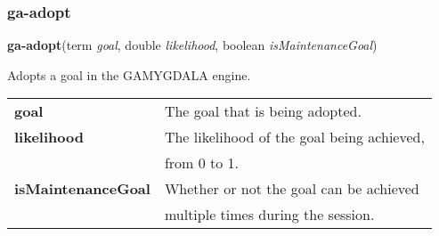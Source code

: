 \subsubsection{ga-adopt}

\textbf{ga-adopt}(term \emph{goal}, double \emph{likelihood}, boolean \emph{isMaintenanceGoal})

Adopts a goal in the GAMYGDALA engine.

\begin{tabular}{l l}
	\textbf{goal} & The goal that is being adopted.\\
	\textbf{likelihood} & The likelihood of the goal being achieved,\\
	& from 0 to 1.\\
	\textbf{isMaintenanceGoal} & Whether or not the goal can be achieved \\
	& multiple times during the session.\\
\end{tabular}